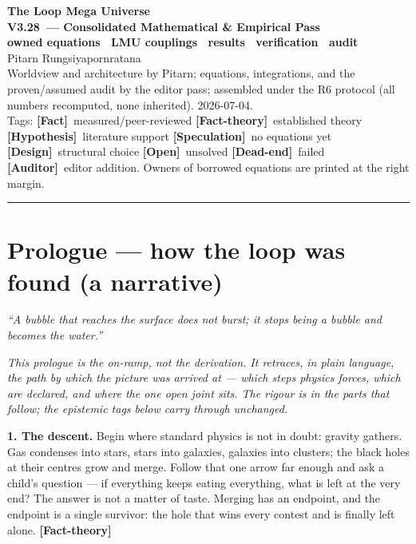 \documentclass[11pt]{article}
\newcommand{\lmuver}{3.28}
\newcommand{\Fact}{\textbf{\textcolor{green!45!black}{[Fact]}}}
\newcommand{\Hyp}{\textbf{\textcolor{blue!55!black}{[Hypothesis]}}}
\newcommand{\Spec}{\textbf{\textcolor{orange!75!black}{[Speculation]}}}
\newcommand{\Dead}{\textbf{\textcolor{red!65!black}{[Dead-end]}}}
\newcommand{\Design}{\textbf{\textcolor{purple!65!black}{[Design]}}}
\newcommand{\Open}{\textbf{\textcolor{gray!10!black}{[Open]}}}
\newcommand{\Auditor}{\textbf{\textcolor{teal!55!black}{[Auditor]}}}
\newcommand{\factth}{\textcolor{green!40!black}{\textbf{[Fact-theory]}}}
\begin{document}
\begin{center}
{\Huge\bfseries The Loop Mega Universe}\\[4pt]
{\LARGE\bfseries V\lmuver\ --- Consolidated Mathematical \& Empirical Pass}\\[3pt]
{\large\bfseries owned equations \textperiodcentered\ LMU couplings \textperiodcentered\ results \textperiodcentered\ verification \textperiodcentered\ audit}\\[8pt]
{\large Pitarn Rungsiyapornratana}\\[2pt]
{\small Worldview and architecture by Pitarn; equations, integrations, and the proven/assumed audit by the editor pass; assembled under the R6 protocol (all numbers recomputed, none inherited). 2026-07-04.}\\[2pt]
{\small Tags: \Fact\ measured/peer-reviewed \quad \factth\ established theory \quad \Hyp\ literature support \quad \Spec\ no equations yet \quad \Design\ structural choice \quad \Open\ unsolved \quad \Dead\ failed \quad \Auditor\ editor addition. Owners of borrowed equations are printed at the right margin.}
\end{center}
\hrule\vspace{6pt}
\part*{Prologue --- how the loop was found (a narrative)}
\begin{flushright}\small\emph{``A bubble that reaches the surface does not burst; it stops being a bubble and becomes the water.''}\end{flushright}

\noindent\emph{This prologue is the on-ramp, not the derivation. It retraces, in plain language, the path by which the picture was arrived at --- which steps physics forces, which are declared, and where the one open joint sits. The rigour is in the parts that follow; the epistemic tags below carry through unchanged.}

\medskip
\noindent\textbf{1. The descent.} Begin where standard physics is not in doubt: gravity gathers. Gas condenses into stars, stars into galaxies, galaxies into clusters; the black holes at their centres grow and merge. Follow that one arrow far enough and ask a child's question --- if everything keeps eating everything, what is left at the very end? The answer is not a matter of taste. Merging has an endpoint, and the endpoint is a single survivor: the hole that wins every contest and is finally left alone. \factth
\end{document}
